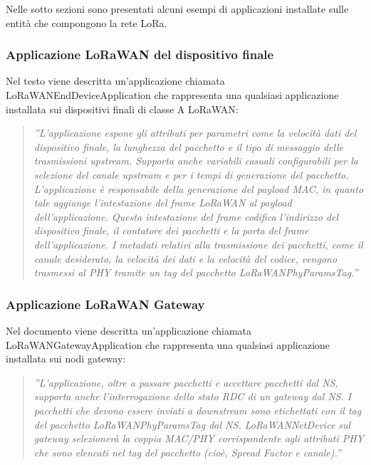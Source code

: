 \documentclass[a4paper]{report} %
\begin{document}
Nelle sotto sezioni sono presentati alcuni esempi di applicazioni installate sulle entità che compongono la rete LoRa.

\subsubsection{Applicazione LoRaWAN del dispositivo finale}
Nel testo \cite{art:rif.49} viene descritta un'applicazione chiamata LoRaWANEndDeviceApplication che rappresenta una qualsiasi applicazione installata sui dispositivi finali di classe A LoRaWAN: 
\begin{quote}
	\textit{''L'applicazione espone gli attributi per parametri come la velocità dati del dispositivo finale, la lunghezza del pacchetto e il tipo di messaggio delle trasmissioni upstream. Supporta anche variabili casuali configurabili per la selezione del canale upstream e per i tempi di generazione del pacchetto. L'applicazione è responsabile della generazione del payload MAC, in quanto tale aggiunge l'intestazione del frame LoRaWAN al payload dell'applicazione. Questa intestazione del frame codifica l'indirizzo del dispositivo finale, il contatore dei pacchetti e la porta del frame dell'applicazione. I metadati relativi alla trasmissione dei pacchetti, come il canale desiderato, la velocità dei dati e la velocità del codice, vengono trasmessi al PHY tramite un tag del pacchetto LoRaWANPhyParamsTag.''}
\end{quote}

\subsubsection{Applicazione LoRaWAN Gateway}
Nel documento \cite{art:rif.49} viene descritta un'applicazione chiamata LoRaWANGatewayApplication che rappresenta una qualsiasi applicazione installata sui nodi gateway:
\begin{quote}
	\textit{''L'applicazione, oltre a passare pacchetti e accettare pacchetti dal NS, supporta anche l'interrogazione dello stato RDC di un gateway dal NS. I pacchetti che devono essere inviati a downstream sono etichettati con il tag del pacchetto LoRaWANPhyParamsTag dal NS. LoRaWANNetDevice sul gateway selezionerà la coppia MAC/PHY corrispondente agli attributi PHY che sono elencati nel tag del pacchetto (cioè, Spread Factor e canale).''}
\end{quote}
\end{document}
